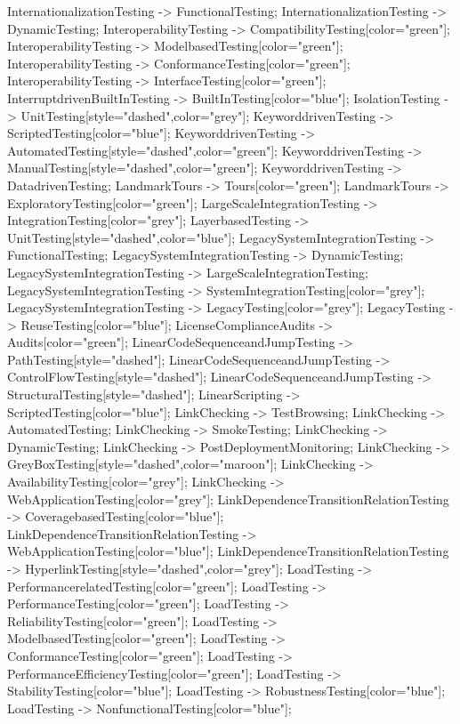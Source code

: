 \documentclass{article}
\begin{document}
{InternationalizationTesting -> FunctionalTesting;
InternationalizationTesting -> DynamicTesting;
InteroperabilityTesting -> CompatibilityTesting[color="green"];
InteroperabilityTesting -> ModelbasedTesting[color="green"];
InteroperabilityTesting -> ConformanceTesting[color="green"];
InteroperabilityTesting -> InterfaceTesting[color="green"];
InterruptdrivenBuiltInTesting -> BuiltInTesting[color="blue"];
IsolationTesting -> UnitTesting[style="dashed",color="grey"];
KeyworddrivenTesting -> ScriptedTesting[color="blue"];
KeyworddrivenTesting -> AutomatedTesting[style="dashed",color="green"];
KeyworddrivenTesting -> ManualTesting[style="dashed",color="green"];
KeyworddrivenTesting -> DatadrivenTesting;
LandmarkTours -> Tours[color="green"];
LandmarkTours -> ExploratoryTesting[color="green"];
LargeScaleIntegrationTesting -> IntegrationTesting[color="grey"];
LayerbasedTesting -> UnitTesting[style="dashed",color="blue"];
LegacySystemIntegrationTesting -> FunctionalTesting;
LegacySystemIntegrationTesting -> DynamicTesting;
LegacySystemIntegrationTesting -> LargeScaleIntegrationTesting;
LegacySystemIntegrationTesting -> SystemIntegrationTesting[color="grey"];
LegacySystemIntegrationTesting -> LegacyTesting[color="grey"];
LegacyTesting -> ReuseTesting[color="blue"];
LicenseComplianceAudits -> Audits[color="green"];
LinearCodeSequenceandJumpTesting -> PathTesting[style="dashed"];
LinearCodeSequenceandJumpTesting -> ControlFlowTesting[style="dashed"];
LinearCodeSequenceandJumpTesting -> StructuralTesting[style="dashed"];
LinearScripting -> ScriptedTesting[color="blue"];
LinkChecking -> TestBrowsing;
LinkChecking -> AutomatedTesting;
LinkChecking -> SmokeTesting;
LinkChecking -> DynamicTesting;
LinkChecking -> PostDeploymentMonitoring;
LinkChecking -> GreyBoxTesting[style="dashed",color="maroon"];
LinkChecking -> AvailabilityTesting[color="grey"];
LinkChecking -> WebApplicationTesting[color="grey"];
LinkDependenceTransitionRelationTesting -> CoveragebasedTesting[color="blue"];
LinkDependenceTransitionRelationTesting -> WebApplicationTesting[color="blue"];
LinkDependenceTransitionRelationTesting -> HyperlinkTesting[style="dashed",color="grey"];
LoadTesting -> PerformancerelatedTesting[color="green"];
LoadTesting -> PerformanceTesting[color="green"];
LoadTesting -> ReliabilityTesting[color="green"];
LoadTesting -> ModelbasedTesting[color="green"];
LoadTesting -> ConformanceTesting[color="green"];
LoadTesting -> PerformanceEfficiencyTesting[color="green"];
LoadTesting -> StabilityTesting[color="blue"];
LoadTesting -> RobustnessTesting[color="blue"];
LoadTesting -> NonfunctionalTesting[color="blue"];
}
\end{document}
